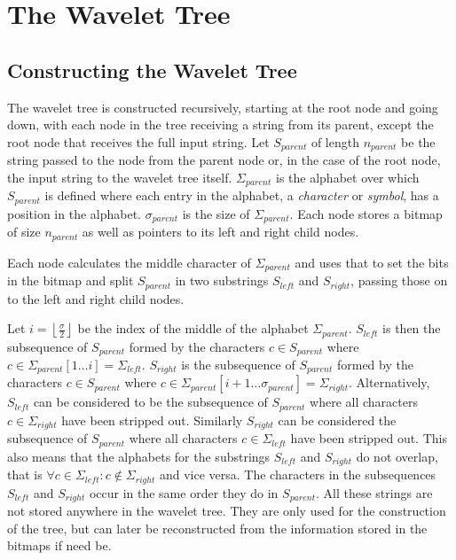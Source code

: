 \section{The Wavelet Tree}


\subsection{Constructing the Wavelet Tree}
\label{sec:nodeconstruction}
The wavelet tree is constructed recursively, starting at the root node and going down, with each node in the tree receiving a string from its parent, except the root node that receives the full input string.
Let $S_{\mathit{parent}}$ of length $n_{\mathit{parent}}$ be the string passed to the node from the parent node or, in the case of the root node, the input string to the wavelet tree itself.
$\Sigma_{\mathit{parent}}$ is the alphabet over which $S_{\mathit{parent}}$ is defined where each entry in the alphabet, a \textit{character} or \textit{symbol}, has a position in the alphabet.
$\sigma_{\mathit{parent}}$ is the size of $\Sigma_{\mathit{parent}}$.
Each node stores a bitmap of size $n_{\mathit{parent}}$ as well as pointers to its left and right child nodes.

Each node calculates the middle character of $\Sigma_{\mathit{parent}}$ and uses that to set the bits in the bitmap and split $S_{\mathit{parent}}$ in two substrings $S_{\mathit{left}}$ and $S_{\mathit{right}}$, passing those on to the left and right child nodes.

Let $i = \left\lfloor\frac{\sigma}{2}\right\rfloor$ be the index of the middle of the alphabet $\Sigma_{\mathit{parent}}$.
$S_{\mathit{left}}$ is then the subsequence of $S_{\mathit{parent}}$ formed by the characters $c \in S_{\mathit{parent}}$ where $c \in \Sigma_{\mathit{parent}}[1 \ldots i] = \Sigma_{\mathit{left}}$.
$S_{\mathit{right}}$ is the subsequence of $S_{\mathit{parent}}$ formed by the characters $c \in S_{\mathit{parent}}$ where $c \in \Sigma_{\mathit{parent}}[i+1 \ldots \sigma_{\mathit{parent}}] = \Sigma_{\mathit{right}}$.
Alternatively, $S_{\mathit{left}}$ can be considered to be the subsequence of $S_{\mathit{parent}}$ where all characters $c \in \Sigma_{\mathit{right}}$ have been stripped out. Similarly $S_{\mathit{right}}$ can be considered the subsequence of $S_{\mathit{parent}}$ where all characters $c \in \Sigma_{\mathit{left}}$ have been stripped out.
This also means that the alphabets for the substrings $S_{\mathit{left}}$ and $S_{\mathit{right}}$ do not overlap, that is $\forall c \in \Sigma_{\mathit{left}}: c \notin \Sigma_{\mathit{right}}$ and vice versa.
The characters in the subsequences $S_{\mathit{left}}$ and $S_{\mathit{right}}$ occur in the same order they do in $S_{\mathit{parent}}$.
All these strings are not stored anywhere in the wavelet tree.
They are only used for the construction of the tree, but can later be reconstructed from the information stored in the bitmaps if need be.

